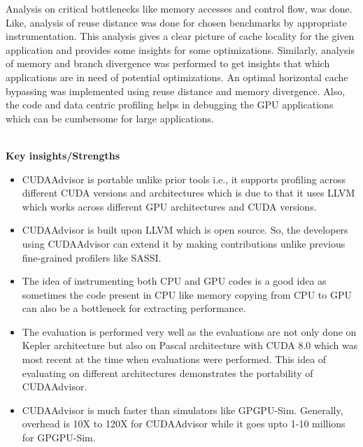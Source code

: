 \documentclass[20pt]{letter}
\begin{document}
\begin{enumerate}
{Analysis on critical bottlenecks like memory accesses and control flow, was done. Like, analysis of reuse distance was done for chosen benchmarks by appropriate instrumentation. This analysis gives a clear picture of cache locality for the given application and provides some insights for some optimizations. Similarly, analysis of memory and branch divergence was performed to get insights that which applications are in need of potential optimizations. An optimal horizontal cache bypassing was implemented using reuse distance and memory divergence. Also, the code and data centric profiling helps in debugging the GPU applications which can be cumbersome for large applications.

\textbf{\\Key insights/Strengths}\\
\begin{itemize}
    \item CUDAAdvisor is portable unlike prior tools i.e., it supports profiling across different CUDA versions and architectures which is due to that it uses LLVM which works across different GPU architectures and CUDA versions.\\

    \item CUDAAdvisor is built upon LLVM which is open source. So, the developers using CUDAAdvisor can extend it by making contributions unlike previous fine-grained profilers like SASSI.\\

    \item The idea of instrumenting both CPU and GPU codes is a good idea as sometimes the code present in CPU like memory copying from CPU to GPU can also be a bottleneck for extracting performance.\\

    \item The evaluation is performed very well as the evaluations are not only done on Kepler architecture but also on Pascal architecture with CUDA 8.0 which was most recent at the time when evaluations were performed. This idea of evaluating on different architectures demonstrates the portability of CUDAAdvisor.\\

    \item CUDAAdvisor is much faster than simulators like GPGPU-Sim. Generally, overhead is 10X to 120X for CUDAAdvisor while it goes upto 1-10 millions for GPGPU-Sim.\\


\end{itemize}}
\end{enumerate}
\end{document}

